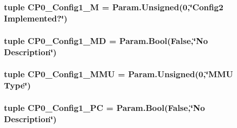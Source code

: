 \label{classMipsCPU_1_1BaseMipsCPU_a471ff632ecf23727fcf1796c33a1a1dd}
\hypertarget{classMipsCPU_1_1BaseMipsCPU_a219543c61e746510759955cbb4a5bb1e}{
\subsubsection[{CP0\_\-Config1\_\-M}]{\setlength{\rightskip}{0pt plus 5cm}tuple {\bf CP0\_\-Config1\_\-M} = Param.Unsigned(0,\char`\"{}Config2 Implemented?\char`\"{})}}
\label{classMipsCPU_1_1BaseMipsCPU_a219543c61e746510759955cbb4a5bb1e}
\hypertarget{classMipsCPU_1_1BaseMipsCPU_a5d8a60ca1a38c0a962f5bd1e19195ecc}{
\subsubsection[{CP0\_\-Config1\_\-MD}]{\setlength{\rightskip}{0pt plus 5cm}tuple {\bf CP0\_\-Config1\_\-MD} = Param.Bool(False,\char`\"{}No Description\char`\"{})}}
\label{classMipsCPU_1_1BaseMipsCPU_a5d8a60ca1a38c0a962f5bd1e19195ecc}
\hypertarget{classMipsCPU_1_1BaseMipsCPU_a251ce2a8fdbc8fff949c31dc01845650}{
\subsubsection[{CP0\_\-Config1\_\-MMU}]{\setlength{\rightskip}{0pt plus 5cm}tuple {\bf CP0\_\-Config1\_\-MMU} = Param.Unsigned(0,\char`\"{}MMU Type\char`\"{})}}
\label{classMipsCPU_1_1BaseMipsCPU_a251ce2a8fdbc8fff949c31dc01845650}
\hypertarget{classMipsCPU_1_1BaseMipsCPU_a97539887d1811697a726dfb4e531f8f4}{
\subsubsection[{CP0\_\-Config1\_\-PC}]{\setlength{\rightskip}{0pt plus 5cm}tuple {\bf CP0\_\-Config1\_\-PC} = Param.Bool(False,\char`\"{}No Description\char`\"{})}}

